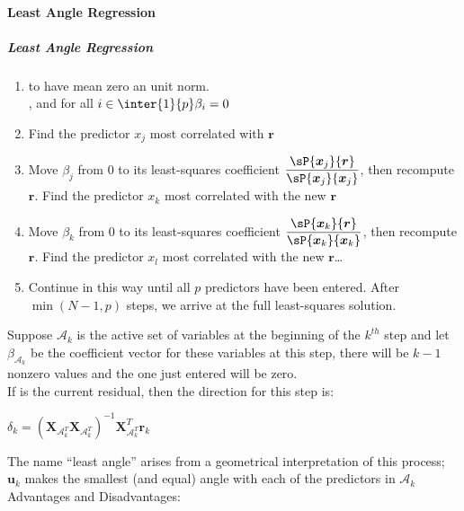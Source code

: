 \paragraph{Least Angle Regression}
\subparagraph{Least Angle Regression}
\begin{enumerate}
	\item {} to have mean zero an unit 
		norm.\\ , and for all $i\in\inter{1}{p}
		\beta_{i}=0$
	\item Find the predictor $x_{j}$ most correlated with $\bm{r}$
	\item Move $\beta_{j}$ from 0 to its least-squares coefficient
		$\dfrac{\sP{\bm{x}_{j}}{\bm{r}}}{\sP{\bm{x}_{j}}{\bm{x}_{j}}}$, then recompute 
		$\bm{r}$. Find the predictor $x_{k}$ most correlated with the new $\bm{r}$
	\item Move $\beta_{k}$ from 0 to its least-squares coefficient
		$\dfrac{\sP{\bm{x}_{k}}{\bm{r}}}{\sP{\bm{x}_{k}}{\bm{x}_{k}}}$, then recompute 
		$\bm{r}$. Find the predictor $x_{l}$ most correlated with the new $\bm{r}$\dots
	\item Continue in this way until all $p$ predictors have been
		entered. After $\min(N-1, p)$ steps, we arrive at the
		full least-squares solution.
\end{enumerate}
Suppose $\mathcal{A}_{k}$ is the active set of variables at the 
beginning of the $k^{th}$ step and let $\beta_{\mathcal{A}_{k}}$ be the
coefficient vector for these variables at this step, there will be 
$k-1$ nonzero values and the one just entered will be zero.\\
If 
is the current residual, then the direction for this step is:
\begin{center}
	$\delta_{k}=(\bm{X}_{\mathcal{A}_{k}^{T}}\bm{X}_{\mathcal{A}_{k}^{T}})^{-1}\bm{X}_{\mathcal{A}_{k}^{T}}^{T}\bm{r}_{k}$
\end{center}
The name ``least angle'' arises from a geometrical interpretation of 
this process; $\bm{u}_{k}$ makes the smallest (and equal) angle with
each of the predictors in $\mathcal{A}_{k}$
Advantages and Disadvantages:
